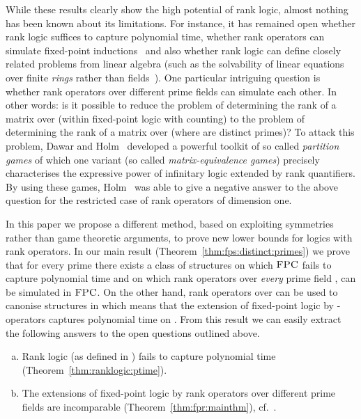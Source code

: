 \documentclass[a4paper,UKenglish]{lipics}
\newcommand{\logic}[1]{\ensuremath{\textsc{#1}}\xspace}
\newcommand{\FPC}{\logic{FPC}}
\theoremstyle{plain}
\begin{document}
\medskip
While these results clearly show the high potential of rank 
logic, almost nothing has been known about its limitations.
For instance, it has remained open whether rank logic suffices to capture 
polynomial time, whether rank operators can simulate fixed-point 
inductions~\cite{DaGrHoLa09} and also whether rank logic 
can define closely related problems from linear algebra 
(such as the solvability of linear equations over finite 
\emph{rings} rather than fields~\cite{DaGrHoKoPa13}).
One particular intriguing question is whether rank operators over 
different prime fields can simulate each other. In other words:
 is it possible to reduce the problem of determining the rank of a matrix over 
 (within fixed-point logic with counting) to the 
problem of determining the rank of a matrix over  (where  are 
distinct primes)?
To attack this problem, Dawar and Holm~\cite{DaHo12, Ho10} 
developed a powerful toolkit of so called \emph{partition games} of which one 
variant (so called \emph{matrix-equivalence games}) precisely characterises the 
expressive power of infinitary logic extended by rank quantifiers.
By using these games, Holm~\cite{Ho10} was able to give a negative answer to 
the 
above question for the restricted case of rank operators of dimension one.

\smallskip
In this paper we propose a different method, based 
on exploiting symmetries rather than game theoretic arguments, to prove new 
lower bounds for logics with rank operators.
In our main result (Theorem~\ref{thm:fps:distinct:primes}) we prove that for 
every prime  there exists a class of structures  on which \FPC fails 
to capture polynomial time and on which rank operators over \emph{every} prime 
field ,  can be simulated in \FPC.
On the other hand, rank operators over  can be used to canonise 
structures in  which means that the extension of fixed-point logic by
-operators captures polynomial time on .
From this result we can easily extract the following answers to the open 
questions outlined above.
\begin{enumerate}[(a)]
 \item Rank logic (as defined in \cite{DaGrHoLa09}) fails to capture polynomial 
time (Theorem~\ref{thm:ranklogic:ptime}).
 \item The extensions of fixed-point logic by rank operators over 
different prime fields are incomparable (Theorem~\ref{thm:fpr:mainthm}), cf.\ 
\cite{Ho10,DaHo12,La11}.
\end{enumerate}
\end{document}

